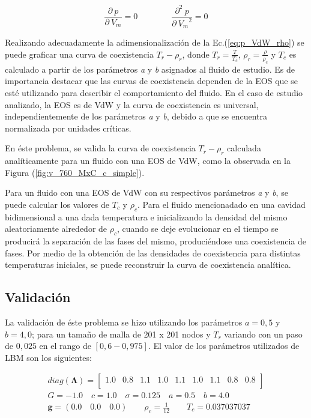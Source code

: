 \begin{equation}
	\frac{\partial\> p}{\partial\> V_{m}} = 0 \qquad \qquad \frac{\partial^{2} \> p}{\partial\> {V_{m}}^{2}} = 0
	\label{eq:criterio_1_2_deriv}
\end{equation}

Realizando adecuadamente la adimensionalización  de la Ec.(\ref{eq:p_VdW_rho}) se puede graficar una curva de coexistencia $T_r - \rho_r$, donde $T_r = \frac{T}{T_c}$, $\rho_r = \frac{\rho}{\rho_c}$ y $T_c$ es calculado a partir de los parámetros \textit{a} y \textit{b} asignados al fluido de estudio. Es de importancia destacar que las curvas de coexistencia dependen de la EOS que se esté utilizando para describir el comportamiento del fluido. En el caso de estudio analizado, la EOS es de VdW y la curva de coexistencia es universal, independientemente de los parámetros \textit{a} y \textit{b}, debido a que se encuentra normalizada por unidades críticas.

En éste problema, se valida la curva de coexistencia $T_r - \rho_r$ calculada analíticamente para un fluido con una EOS de VdW, como la observada en la Figura (\ref{fig:v_760_MxC_c_simple}). 

Para un fluido con una EOS de VdW con su respectivos parámetros \textit{a} y \textit{b}, se puede calcular los valores de $T_c$ y $\rho_c$. Para  el fluido mencionadado en una cavidad bidimensional a una dada temperatura e inicializando la densidad del mismo aleatoriamente alrededor de  $\rho_c$, cuando se deje evolucionar en el tiempo se producirá la separación de las fases del mismo, produciéndose una coexistencia de fases. Por medio de la obtención de las densidades de coexistencia para distintas temperaturas iniciales, se puede reconstruir la curva de coexistencia analítica.

\subsection{Validación}

La validación de éste problema se hizo utilizando los parámetros $a =0,5$ y $b = 4,0$; para un tamaño de malla de 201 x 201 nodos y $T_r$ variando con un paso de $0,025$ en el rango de $[0,6 - 0,975]$.  El valor de los parámetros utilizados de LBM son los siguientes:

\begin{align*}
diag(\mathbf{\Lambda}) = 
\begin{bmatrix}
1.0 & 0.8 & 1.1 & 1.0 & 1.1 & 1.0 & 1.1 & 0.8 & 0.8 \\
\end{bmatrix}\\
G = -1.0 \quad c = 1.0 \quad \sigma = 0.125 \quad a = 0.5 \quad b = 4.0 \\
\mathbf{g} = (0.0 \quad 0.0 \quad 0.0 ) \qquad \rho_c = \frac{1}{12} \qquad T_c = 0.037037037
\end{align*}

